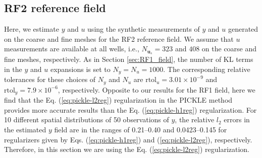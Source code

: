 \documentclass{agujournal2019}
\begin{document}
\subsection{RF2 reference field}\label{sec:RF2_field}
Here, we estimate $y$ and $u$ using the synthetic measurements of $y$ and $u$ generated on the coarse and fine meshes for the RF2 reference field. 
We assume that $u$ measurements are available at all wells, i.e.,  $N_{\mathbf{u}_s}=323$ and $408$ on the coarse and fine meshes, respectively. 
As in Section \ref{sec:RF1_field}, the number of KL terms in the $y$ and $u$ expansions is set to $N_y= N_u=1000$. 
 The corresponding relative tolerances for these choices of $N_y$ and $N_u$ are 
$\text{rtol}_u = 3.01 \times 10^{-9}$
and
$\text{rtol}_y = 7.9 \times 10^{-6}$, respectively.
Opposite to our results for the RF1 field, here we find that the Eq. (\ref{eq:pickle-l2reg}) regularization in the PICKLE method provides more accurate results than the Eq. (\ref{eq:pickle-h1reg})  regularization. 
For 10 different spatial distributions of 50 observations of $y$, the relative $l_2$ errors in the estimated $y$ field are in the ranges of 0.21--0.40 and 0.0423--0.145 for regularizers given by Eqs. (\ref{eq:pickle-h1reg}) and (\ref{eq:pickle-l2reg}), respectively. Therefore, in this section we are using the Eq. (\ref{eq:pickle-l2reg}) regularization.
\end{document}
